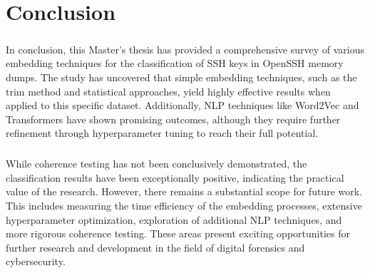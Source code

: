 \chapter{Conclusion}\label{chap:conclusion}

\paragraph{}In conclusion, this Master's thesis has provided a comprehensive survey of various embedding techniques for the classification of SSH keys in OpenSSH memory dumps. The study has uncovered that simple embedding techniques, such as the trim method and statistical approaches, yield highly effective results when applied to this specific dataset. Additionally, NLP techniques like Word2Vec and Transformers have shown promising outcomes, although they require further refinement through hyperparameter tuning to reach their full potential.

\paragraph{}While coherence testing has not been conclusively demonstrated, the classification results have been exceptionally positive, indicating the practical value of the research. However, there remains a substantial scope for future work. This includes measuring the time efficiency of the embedding processes, extensive hyperparameter optimization, exploration of additional NLP techniques, and more rigorous coherence testing. These areas present exciting opportunities for further research and development in the field of digital forensics and cybersecurity.
